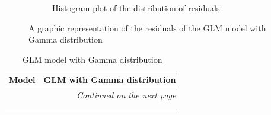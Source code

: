 \documentclass[12pt,a4paper,twoside]{article}
\begin{document}
\begin{figure}[!ht]
\begin{subfigure}{.45\textwidth}
        \caption{Histogram plot of the distribution of residuals}
        \label{fig:gammahist}
    \end{subfigure}
    \caption{A graphic representation of the residuals of the GLM model with Gamma distribution}
    \label{fig:gammafig}
\end{figure}

\begin{longtable}{l|p{}|p{}}
	\textbf{Model} & \multicolumn{2}{r}{GLM with Gamma distribution} \\
	\hline
	\endhead
	\hline
	\multicolumn{3}{r}{\emph{Continued on the next page}}    \\
	\endfoot
	\hline
	\endlastfoot
	\hline
	 &  &  \\
	 \caption{GLM model with Gamma distribution}
	 \label{tab:part1res}
\end{longtable}
\end{document}
